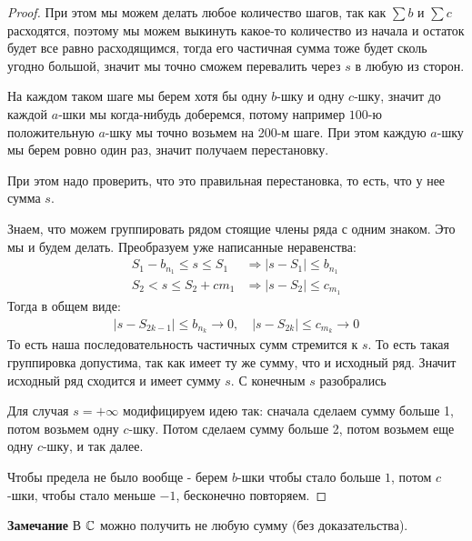 \begin{proof}
    При этом мы можем делать любое количество шагов, так как $\sum b$ и $\sum c$ расходятся, поэтому мы можем
    выкинуть какое-то количество из начала и остаток будет все равно расходящимся, тогда его частичная сумма тоже будет сколь угодно большой,
    значит мы точно сможем перевалить через $s$ в любую из сторон.

    На каждом таком шаге мы берем хотя бы одну $b$-шку и одну $c$-шку, значит до каждой $a$-шки мы когда-нибудь доберемся, потому
    например $100$-ю положительную $a$-шку мы точно возьмем на 200-м шаге.
    При этом каждую $a$-шку мы берем ровно один раз, значит получаем перестановку.
    
    При этом надо проверить, что это правильная перестановка, то есть, что у нее сумма $s$.

    Знаем, что можем группировать рядом стоящие члены ряда с одним знаком. Это мы и будем делать. 
    Преобразуем уже написанные неравенства:
    \begin{align*}
        S_1 - b_{n_1} \leqslant s \leqslant S_1 &\Longrightarrow |s - S_1| \leqslant b_{n_1} \\
        S_2 < s \leqslant S_2 + c{m_1} &\Longrightarrow |s - S_2| \leqslant c_{m_1}
    \end{align*}
    Тогда в общем виде:
    \begin{gather*}
        |s - S_{2k-1}| \leq b_{n_k} \to 0, \quad |s - S_{2k}| \leq c_{m_k} \to 0
    \end{gather*}
    То есть наша последовательность частичных сумм стремится к $s$. То есть такая группировка допустима, так как имеет ту же сумму, что и исходный ряд. 
    Значит исходный ряд сходится и имеет сумму $s$. С конечным $s$ разобрались

    Для случая $s = +\infty$ модифицируем идею так: сначала сделаем сумму больше 1, потом возьмем одну $c$-шку. Потом сделаем
    сумму больше 2, потом возьмем еще одну $c$-шку, и так далее. 
    
    Чтобы предела не было вообще - берем $b$-шки чтобы стало больше $1$,
    потом $c$-шки, чтобы стало меньше $-1$, бесконечно повторяем.
\end{proof}

\textbf{Замечание} В $\mathbb{C}$ можно получить не любую сумму (без доказательства).

